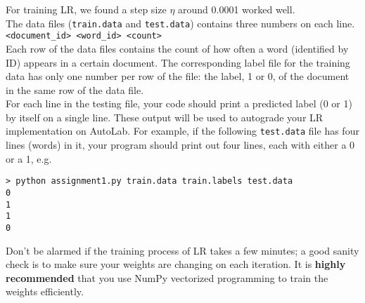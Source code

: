 \documentclass[paper=a4, fontsize=11pt]{scrartcl} %
\numberwithin{equation}{section} %
\numberwithin{figure}{section} %
\numberwithin{table}{section} %
\begin{document}
For training LR, we found a step size $\eta$ around 0.0001 worked well. \\

The data files (\texttt{train.data} and \texttt{test.data}) contains three numbers on each line. \\

\texttt{<document\_id> <word\_id> <count>} \\

Each row of the data files contains the count of how often a word (identified by ID) appears in a certain document. The corresponding label file for the training data has only one number per row of the file: the label, 1 or 0, of the document in the same row of the data file. \\

For each line in the testing file, your code should print a predicted label (0 or 1) by itself on a single line. These output will be used to autograde your LR implementation on AutoLab. For example, if the following \texttt{test.data} file has four lines (words) in it, your program should print out four lines, each with either a 0 or a 1, e.g.

\begin{verbatim}
> python assignment1.py train.data train.labels test.data
0
1
1
0
\end{verbatim}

Don't be alarmed if the training process of LR takes a few minutes; a good sanity check is to make sure your weights are changing on each iteration. It is \textbf{highly recommended} that you use NumPy vectorized programming to train the weights efficiently.
\end{document}
